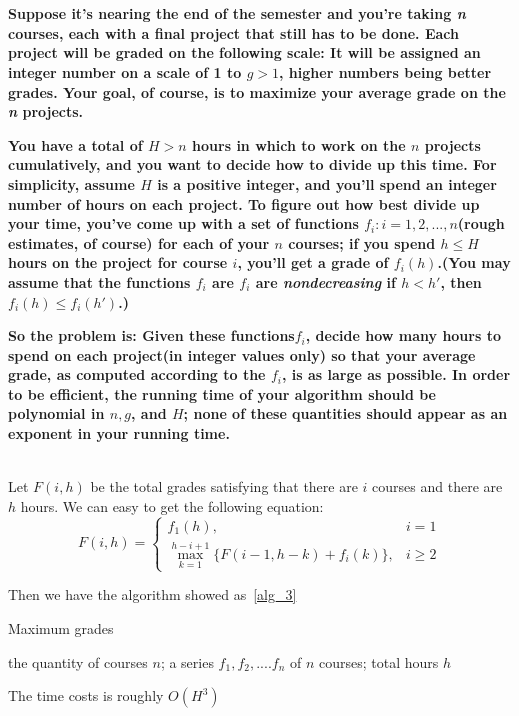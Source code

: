
\chapter{}

\textbf{
Suppose it's nearing the end of the semester and you're taking \emph{n} courses, each with a final project that still has to be done. Each project will be graded on the following scale: It will be assigned an integer number on a scale of 1 to $g>1$, higher numbers being better grades. Your goal, of course, is to maximize your average grade on the \emph{n} projects.
}

\textbf{
You have a total of $H>n$ hours in which to work on the $n$ projects cumulatively, and you want to decide how to divide up this time. For simplicity, assume $H$ is a positive integer, and you'll spend an integer number of hours on each project. To figure out how best divide up your time, you've come up with a set of functions $f_i: i=1,2,...,n$(rough estimates, of course) for each of your $n$ courses; if you spend $h\leq H$ hours on the project for course $i$, you'll get a grade of $f_i(h)$.(You may assume that the functions $f_i$ are \emph{$f_i$} are \emph{nondecreasing} if $h<h'$, then $f_i(h)\leq f_i(h')$.)
}

\textbf{
So the problem is: Given these functions{$f_i$}, decide how many hours to spend on each project(in integer values only) so that your average grade, as computed according to the $f_i$, is as large as possible. In order to be efficient, the running time of your algorithm should be polynomial in $n,g$, and $H$; none of these quantities should appear as an exponent in your running time.
}

\hspace*{\fill} \\
Let $F(i,h)$ be the total grades satisfying that there are $i$ courses and there are $h$ hours.
We can easy to get the following equation:
\begin{equation}
F(i,h)=
\left\{
             \begin{array}{lr}
             f_1(h),
             & i=1 \\
             \max\limits_{k=1}^{h-i+1}\{F(i-1,h-k)+f_i(k)\},
             & i\geq 2
             \end{array}
\right.
\end{equation}

Then we have the algorithm showed as~\ref{alg_3}
\begin{algorithm}
\caption{Maximum grades}
\label{alg_3}
\begin{algorithmic}[1]
\REQUIRE the quantity of courses $n$; a series $f_1,f_2,....f_n$ of $n$ courses; total hours $h$
\ENDFOR
{}
    \ENDFOR
\ENDFOR
{}
\end{algorithmic}
\end{algorithm}

The time costs is roughly $O(H^3)$
